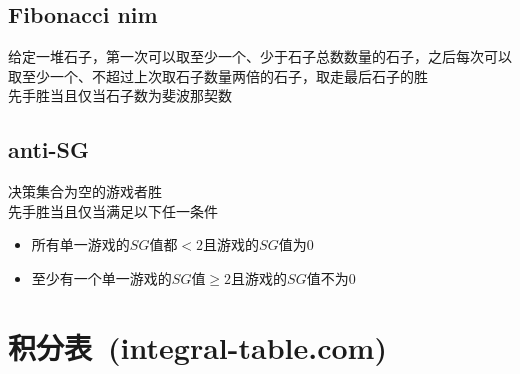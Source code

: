     \subsection*{Fibonacci nim}
        给定一堆石子，第一次可以取至少一个、少于石子总数数量的石子，之后每次可以取至少一个、不超过上次取石子数量两倍的石子，取走最后石子的胜
        \\先手胜当且仅当石子数为斐波那契数
    \subsection*{anti-SG}
        决策集合为空的游戏者胜
        \\先手胜当且仅当满足以下任一条件
        \begin{itemize}[nosep,wide=0pt]
            \item 所有单一游戏的$ SG $值都$ < 2 $且游戏的$ SG $值为$ 0 $
            \item 至少有一个单一游戏的$ SG $值$ \geq 2 $且游戏的$ SG $值不为$ 0 $
        \end{itemize}
\section{积分表\ \small(integral-table.com)}
    
